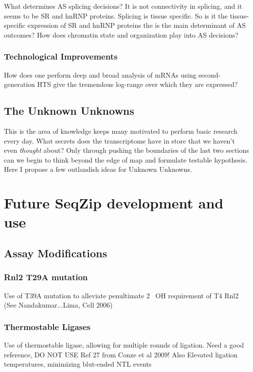       What determines AS splicing decisions? It is not connectivity in splicing, and it seems to be SR and hnRNP proteins. Splicing is tissue specific. So is it the tissue-specific expression of SR and hnRNP proteins the is the main determinant of AS outcomes? How does chromatin state and organization play into AS decisions? 

    \subsubsection{Technological Improvements}
      How does one perform deep and broad analysis of mRNAs using second-generation HTS give the tremendous log-range over which they are expressed?

  \subsection{The Unknown Unknowns}\label{subsec: The Unknown Unknowns}

    This is the area of knowledge keeps many motivated to perform basic research every day. What secrets does the transcriptome have in store that we haven't even \textit{thought} about? Only through pushing the boundaries of the last two sections can we begin to think beyond the edge of map and formulate testable hypothesis. Here I propose a few outlandish ideas for Unknown Unknowns. 

\section{Future SeqZip development and use}

  \subsection{Assay Modifications}

    \subsubsection{Rnl2 T29A mutation}

    Use of T39A mutation to alleviate penultimate 2\textprime~ OH requirement of T4 Rnl2 (See Nandakumar...Lima, Cell 2006)

    \subsubsection{Thermostable Ligases}

    Use of thermostable ligase, allowing for multiple rounds of ligation. Need a good reference, DO NOT USE Ref 27 from Conze et al 2009! Also Elevated ligation temperatures, minimizing blut-ended NTL events

